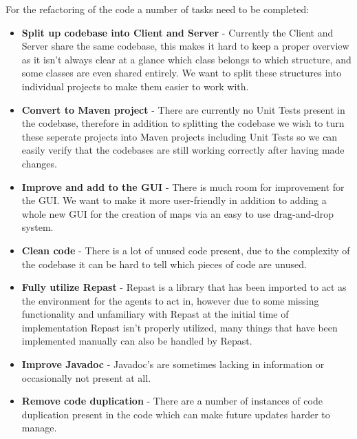 For the refactoring of the code a number of tasks need to be completed:
\begin{itemize}
\item
\textbf{Split up codebase into Client and Server} - Currently the Client and Server share the same codebase, this makes it hard to keep a proper overview as it isn't always clear at a glance which class belongs to which structure, and some classes are even shared entirely. We want to split these structures into individual projects to make them easier to work with.
\item
\textbf{Convert to Maven project} - There are currently no Unit Tests present in the codebase, therefore in addition to splitting the codebase we wish to turn these seperate projects into Maven projects including Unit Tests so we can easily verify that the codebases are still working correctly after having made changes.
\item
\textbf{Improve and add to the GUI} - There is much room for improvement for the GUI. We want to make it more user-friendly in addition to adding a whole new GUI for the creation of maps via an easy to use drag-and-drop system.
\item
\textbf{Clean code} - There is a lot of unused code present, due to the complexity of the codebase it can be hard to tell which pieces of code are unused.
\item
\textbf{Fully utilize Repast} - Repast is a library that has been imported to act as the environment for the agents to act in, however due to some missing functionality and unfamiliary with Repast at the initial time of implementation Repast isn't properly utilized, many things that have been implemented manually can also be handled by Repast.
\item
\textbf{Improve Javadoc} - Javadoc's are sometimes lacking in information or occasionally not present at all.
\item
\textbf{Remove code duplication} - There are a number of instances of code duplication present in the code which can make future updates harder to manage.
\end{itemize}